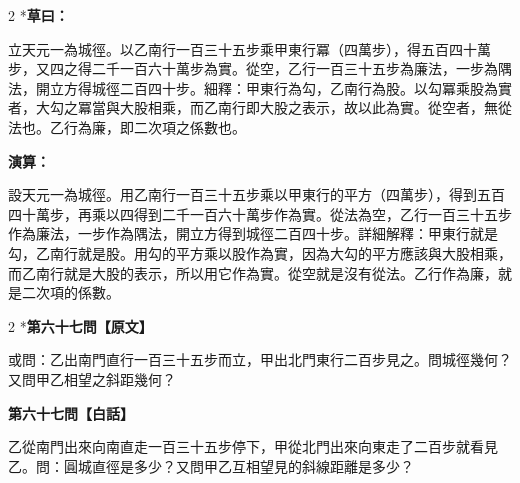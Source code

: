 \documentclass[11pt,a4paper]{article}
\begin{document}
\begin{paracol}{2}
\switchcolumn[0]*\textbf{草曰：}

\small 立天元一為城徑。以乙南行一百三十五步乘甲東行冪（四萬步），得五百四十萬步，又四之得二千一百六十萬步為實。從空，乙行一百三十五步為廉法，一步為隅法，開立方得城徑二百四十步。細釋：甲東行為勾，乙南行為股。以勾冪乘股為實者，大勾之冪當與大股相乘，而乙南行即大股之表示，故以此為實。從空者，無從法也。乙行為廉，即二次項之係數也。

\switchcolumn\textbf{演算：}

\small 設天元一為城徑。用乙南行一百三十五步乘以甲東行的平方（四萬步），得到五百四十萬步，再乘以四得到二千一百六十萬步作為實。從法為空，乙行一百三十五步作為廉法，一步作為隅法，開立方得到城徑二百四十步。詳細解釋：甲東行就是勾，乙南行就是股。用勾的平方乘以股作為實，因為大勾的平方應該與大股相乘，而乙南行就是大股的表示，所以用它作為實。從空就是沒有從法。乙行作為廉，就是二次項的係數。
\end{paracol}

\vspace{0.1cm}
\noindent{}
\par\vspace{0.3cm}

\begin{paracol}{2}
\switchcolumn[0]*\noindent\textbf{第六十七問【原文】}

\small 或問：乙出南門直行一百三十五步而立，甲出北門東行二百步見之。問城徑幾何？又問甲乙相望之斜距幾何？

\switchcolumn\noindent\textbf{第六十七問【白話】}

\small 乙從南門出來向南直走一百三十五步停下，甲從北門出來向東走了二百步就看見乙。問：圓城直徑是多少？又問甲乙互相望見的斜線距離是多少？
\end{paracol}

\vspace{0.1cm}
\noindent{}
\par\vspace{0.15cm}
\end{document}
